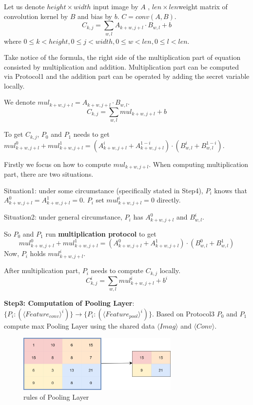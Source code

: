 \documentclass[11pt,twoside,a4paper]{article}
\begin{document}
Let us denote $height\times width$ input image by $A$ , $len\times len$weight matrix of convolution kernel by $B$ and bias by $b$.
$C= conv(A,B)$.
$$C_{k,j}=\sum _{w,l}A_{k+w,j+l}\cdot B_{w,l}+b$$
where $0\leqslant k<height,0\leqslant j<width,0\leqslant w<len,0\leqslant l<len$.

Take notice of the formula, the right side of the multiplication part of equation consisted by multiplication and addition.
Multiplication part can be computed via Protocol1 and the addition part can be operated by adding the secret variable locally. 

We denote $mul_{k+w,j+l}=A_{k+w,j+l}\cdot B_{w,l}$.
$$C_{k,j}=\sum_{w,l} mul_{k+w,j+l}+b$$

To get $C_{k,j}$, $P_{0}$ and $P_{1}$ needs to get $mul_{k+w,j+l}^{0}+mul_{k+w,j+l}^{1}=(A_{k+w,j+l}^{i}+A_{k+w,j+l}^{1-i})\cdot (B_{w,l}^{i}+B_{w,l}^{1-i})$. 

Firstly we focus on how to compute $mul_{k+w,j+l}$. 
When computing multiplication part, there are two situations. 

Situation1: under some circumstance (specifically stated in Step4), 
$P_{i}$ knows that $A_{k+w,j+l}^{0} = A_{k+w,j+l}^{1} = 0$. 
$P_{i}$ set $mul_{k+w,j+l}^{i}=0 $ directly.

Situation2: under general circumstance, $P_{i}$ has $A_{k+w,j+l}^{0}$ and $B_{w,l}^{i}$.

So $P_{0}$ and $P_{1}$ run \textbf{multiplication protocol} to get 
$$mul_{k+w,j+l}^{0}+mul_{k+w,j+l}^{1}=(A_{k+w,j+l}^{0} + A_{k+w,j+l}^{1})\cdot(B_{w,l}^{0}+B_{w,l}^{1})$$
Now, $P_{i}$ holds $mul_{k+w,j+l}^{i}$.

After multiplication part, $P_{i}$ needs to compute $C_{k,j}$ locally.
$$C_{k,j}^{i}=\sum_{w,l} mul_{k+w,j+l}^{i}+b^{i}$$

\textbf{Step3: Computation of Pooling Layer}: $\{P_{i}:(\langle Feature_{conv}\rangle ^{i})\}\rightarrow \{P_{i}:(\langle Feature_{pool}\rangle ^{i})\}$.
Based on Protocol3 $P_{0}$ and $P_{1}$ compute max Pooling Layer using the shared data $\langle Imag\rangle $ and $\langle Conv\rangle $.

\begin{figure}[htbp]
	\includegraphics[width=8cm]{pool.png}
	\caption{rules of Pooling Layer}
\end{figure}
\end{document}
